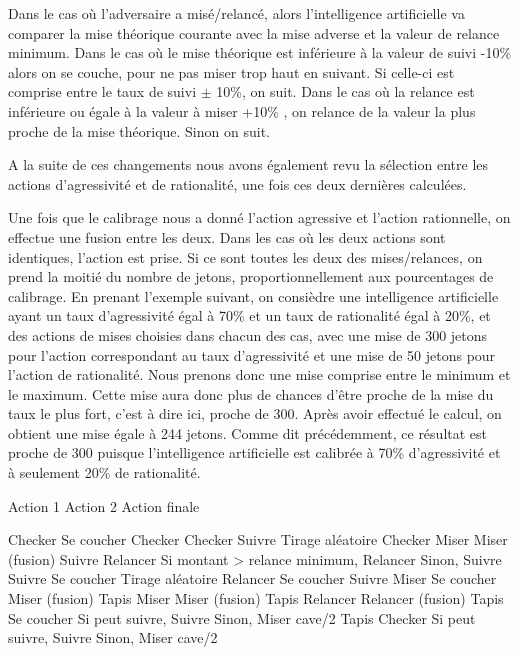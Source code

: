 \documentclass{report}
\begin{document}
Dans le cas où l'adversaire a misé/relancé, alors l'intelligence artificielle va comparer la mise théorique courante avec la mise adverse et la valeur de relance minimum. Dans le cas où le mise théorique est inférieure à la valeur de suivi -10\% alors on se couche, pour ne  pas miser trop haut en suivant. Si celle-ci est comprise entre le taux de suivi $\pm$ 10\%, on suit.
Dans le cas où la relance est inférieure ou égale à la valeur à miser +10\% , on relance de la valeur la plus proche de la mise théorique. Sinon on suit.\par


A la suite de ces changements nous avons également revu la sélection entre les actions d'agressivité et de rationalité, une fois ces deux dernières calculées.\par

Une fois que le calibrage nous a donné l'action agressive et l'action rationnelle, on effectue une fusion entre les deux. Dans les cas où les deux actions sont identiques, l'action est prise. Si ce sont toutes les deux des mises/relances, on prend la moitié du nombre de jetons, proportionnellement aux pourcentages de calibrage.
En prenant l'exemple suivant, on consièdre une intelligence artificielle ayant un taux d'agressivité égal à  70\% et un taux de rationalité égal à 20\%, et des actions de mises choisies dans chacun des cas, avec une mise de 300 jetons pour l'action correspondant au taux d'agressivité et une mise de 50 jetons pour l'action de rationalité. Nous prenons donc une mise comprise entre le minimum et le maximum. Cette mise aura donc plus de chances d'être proche de la mise du taux le plus fort, c'est à dire ici, proche de 300. Après avoir effectué le calcul, on obtient une mise égale à 244 jetons. Comme dit précédemment, ce résultat est proche de 300 puisque l'intelligence artificielle est calibrée à 70\% d'agressivité et à seulement 20\% de rationalité.

	
	Action 1			Action 2 		Action finale
	
	Checker			Se coucher		Checker
	Checker			Suivre			Tirage aléatoire
	Checker			Miser			Miser (fusion)
	Suivre			Relancer			Si montant > relance minimum, Relancer
									Sinon, Suivre
	Suivre			Se coucher		Tirage aléatoire
	Relancer			Se coucher		Suivre
	Miser			Se coucher		Miser (fusion)
	Tapis			Miser			Miser (fusion)
	Tapis			Relancer			Relancer (fusion)
	Tapis			Se coucher		Si peut suivre, Suivre
									Sinon, Miser cave/2
	Tapis			Checker			Si peut suivre, Suivre
									Sinon, Miser cave/2
\end{document}

